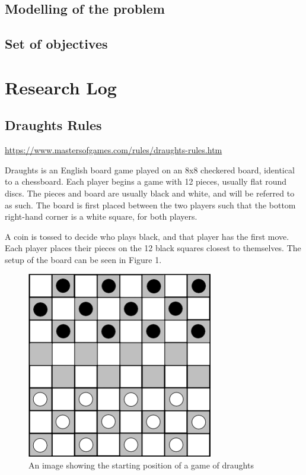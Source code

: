 \documentclass{article}
\begin{document}
    \subsection{Modelling of the problem}

    \subsection{Set of objectives}

    \section{Research Log}

    \subsection{Draughts Rules}
    \url{https://www.mastersofgames.com/rules/draughts-rules.htm}

    Draughts is an English board game played on an 8x8 checkered board, identical to a chessboard.
    Each player begins a game with 12 pieces, usually flat round discs.
    The pieces and board are usually black and white, and will be referred to as such.
    The board is first placed between the two players such that the bottom right-hand corner is a white square,
    for both players.
    
    A coin is tossed to decide who plays black, and that player has the first move. Each player places their pieces
    on the 12 black squares closest to themselves. The setup of the board can be seen in Figure 1. 

    \begin{figure}
        \centering
        \includegraphics[scale=0.35]{The-starting-position-for-checkers.png}
        \caption{An image showing the starting position of a game of draughts}
    \end{figure}
\end{document}
